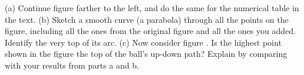 (a) Continue figure  farther to the left, and do the
same for the numerical table in the text.\hwendpart
(b) Sketch a smooth curve (a parabola) through all the points on the figure, including all
the ones from the original figure and all the ones you added. Identify the very top of
its arc.\hwendpart
(c) Now consider figure . Is the highest point shown in the figure the
top of the ball's up-down path? Explain by comparing with your results from parts a and b.
